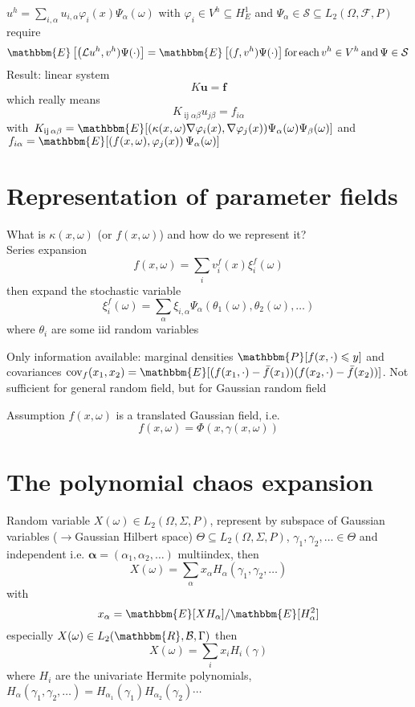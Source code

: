 \documentclass{article}
\newcommand{\tmmathbf}[1]{\ensuremath{\boldsymbol{#1}}}
\newcommand{\tmop}[1]{\ensuremath{\operatorname{#1}}}
\begin{document}
$u^h = \sum_{i, \alpha} u_{i, \alpha} \varphi_i (x) \Psi_{\alpha} (\omega)$
with $\varphi_i \in V^h \subseteq H^1_E$ and $\Psi_{\alpha} \in \mathcal{S}
\subseteq L_2 (\Omega, \mathcal{F}, P)$ require
\[ \mathbbm{E} \left[ \left( \mathcal{L} u^h, v^h) \Psi (\cdot) \right] =
   \mathbbm{E} \left[ (f, v^h) \Psi (\cdot) \right] \tmop{for} \tmop{each} v^h
   \in V^h \tmop{and} \Psi \in \mathcal{S} \right. \]
Result: linear system
\[ K \tmmathbf{u} = \tmmathbf{f} \]
which really means
\[ K_{\tmop{ij} \alpha \beta} u_{j \beta} = f_{i \alpha} \]
with $\left. K_{\tmop{ij} \alpha \beta} = \mathbbm{E} [(\kappa (x, \omega)
\nabla \varphi_i (x), \nabla \varphi_j (x)) \Psi_{\alpha} (\omega)
\Psi_{\beta} (\omega) \right]$ and $\left. f_{i \alpha} = \mathbbm{E} [ \left(
f (x, \omega), \varphi_j (x) \right) \Psi_{\alpha} (\omega) \right]$

{\newpage}

\section{Representation of parameter fields}

What is $\kappa (x, \omega)$ (or $f (x, \omega)$) and how do we represent it?
\[  \]
Series expansion
\[ f (x, \omega) = \sum_i v^f_i (x) \xi^f_i (\omega) \]
then expand the stochastic variable
\[ \xi^f_i (\omega) = \sum_{\alpha} \xi_{i, \alpha} \Psi_{\alpha} (\theta_1
   (\omega), \theta_2 (\omega), \ldots) \]
where $\theta_i$ are some iid random variables



Only information available: marginal densities $\mathbbm{P} [f (x, \cdot)
\leqslant y]$ and covariances $\tmop{cov}_f (x_1, x_2) = \mathbbm{E} [(f (x_1,
\cdot) - \bar{f} (x_1)) (f (x_2, \cdot) - \bar{f} (x_2))]$. Not sufficient for
general random field, but for Gaussian random field



Assumption $f (x, \omega)$ is a translated Gaussian field, i.e.
\[ f (x, \omega) = \Phi (x, \gamma (x, \omega)) \]


{\newpage}

\section{The polynomial chaos expansion}

Random variable $X (\omega) \in L_2 (\Omega, \Sigma, P)$, represent by
subspace of Gaussian variables ($\rightarrow$Gaussian Hilbert space) $\Theta
\subseteq L_2 (\Omega, \Sigma, P)$, $\gamma_1, \gamma_2, \ldots \in \Theta$
and independent i.e. $\tmmathbf{\alpha} = (\alpha_1, \alpha_2, \ldots)$
multiindex, then
\[ X (\omega) = \sum_{\alpha} x_{\alpha} H_{\alpha} (\gamma_1, \gamma_2,
   \ldots) \]
with
\[ x_{\alpha} = \mathbbm{E} [X H_{\alpha}] / \mathbbm{E} [H_{\alpha}^2] \]
especially $X (\omega) \in L_2 ( \mathbbm{R}, \mathcal{B}, \Gamma)$ then
\[ X (\omega) = \sum_i x_i H_i (\gamma) \]
where $H_i$ are the univariate Hermite polynomials, $H_{\alpha} (\gamma_1,
\gamma_2, \ldots) = H_{\alpha_1} (\gamma_1) H_{\alpha_2} (\gamma_2) \cdots$
\end{document}
